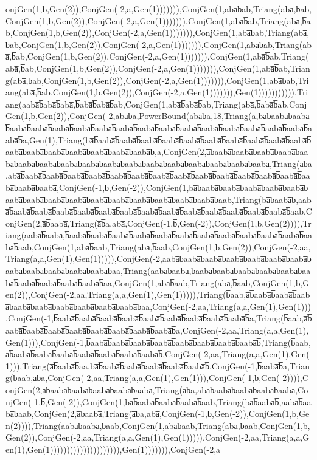 onjGen(1,b,Gen(2)),ConjGen(-2,a,Gen(1))))))),ConjGen(1,aba̅b̅ab,Triang(aba̅,b̅ab,ConjGen(1,b,Gen(2)),ConjGen(-2,a,Gen(1))))))),ConjGen(1,aba̅b̅ab,Triang(aba̅,b̅ab,ConjGen(1,b,Gen(2)),ConjGen(-2,a,Gen(1))))))),ConjGen(1,aba̅b̅ab,Triang(aba̅,b̅ab,ConjGen(1,b,Gen(2)),ConjGen(-2,a,Gen(1))))))),ConjGen(1,aba̅b̅ab,Triang(aba̅,b̅ab,ConjGen(1,b,Gen(2)),ConjGen(-2,a,Gen(1))))))),ConjGen(1,aba̅b̅ab,Triang(aba̅,b̅ab,ConjGen(1,b,Gen(2)),ConjGen(-2,a,Gen(1))))))),ConjGen(1,aba̅b̅ab,Triang(aba̅,b̅ab,ConjGen(1,b,Gen(2)),ConjGen(-2,a,Gen(1))))))),ConjGen(1,aba̅b̅ab,Triang(aba̅,b̅ab,ConjGen(1,b,Gen(2)),ConjGen(-2,a,Gen(1))))))),Gen(1))))))))))),Triang(aaba̅b̅aba̅b̅aba̅,b̅aba̅b̅aba̅b̅ab,ConjGen(1,aba̅b̅aba̅b̅ab,Triang(aba̅,b̅aba̅b̅ab,ConjGen(1,b,Gen(2)),ConjGen(-2,aba̅b̅a,PowerBound(aba̅b̅a,18,Triang(a,ba̅b̅aaba̅b̅aaba̅b̅aaba̅b̅aaba̅b̅aaba̅b̅aaba̅b̅aaba̅b̅aaba̅b̅aaba̅b̅aaba̅b̅aaba̅b̅aaba̅b̅aaba̅b̅aaba̅b̅aaba̅b̅aaba̅b̅aaba̅b̅a,Gen(1),Triang(ba̅b̅aaba̅b̅aaba̅b̅aaba̅b̅aaba̅b̅aaba̅b̅aaba̅b̅aaba̅b̅aaba̅b̅aaba̅b̅aaba̅b̅aaba̅b̅aaba̅b̅aaba̅b̅aaba̅b̅aaba̅b̅aaba̅b̅aaba̅b̅,a,ConjGen(2,a̅b̅aaba̅b̅aaba̅b̅aaba̅b̅aaba̅b̅aaba̅b̅aaba̅b̅aaba̅b̅aaba̅b̅aaba̅b̅aaba̅b̅aaba̅b̅aaba̅b̅aaba̅b̅aaba̅b̅aaba̅b̅aaba̅b̅aaba̅,Triang(a̅b̅a,aba̅b̅aaba̅b̅aaba̅b̅aaba̅b̅aaba̅b̅aaba̅b̅aaba̅b̅aaba̅b̅aaba̅b̅aaba̅b̅aaba̅b̅aaba̅b̅aaba̅b̅aaba̅b̅aaba̅b̅aaba̅b̅aaba̅,ConjGen(-1,b̅,Gen(-2)),ConjGen(1,ba̅b̅aaba̅b̅aaba̅b̅aaba̅b̅aaba̅b̅aaba̅b̅aaba̅b̅aaba̅b̅aaba̅b̅aaba̅b̅aaba̅b̅aaba̅b̅aaba̅b̅aaba̅b̅aaba̅b̅aaba̅b̅aab,Triang(ba̅b̅aaba̅b̅,aaba̅b̅aaba̅b̅aaba̅b̅aaba̅b̅aaba̅b̅aaba̅b̅aaba̅b̅aaba̅b̅aaba̅b̅aaba̅b̅aaba̅b̅aaba̅b̅aaba̅b̅aaba̅b̅aab,ConjGen(2,a̅b̅aaba̅,Triang(a̅b̅a,aba̅,ConjGen(-1,b̅,Gen(-2)),ConjGen(1,b,Gen(2)))),Triang(aaba̅b̅aaba̅,b̅aaba̅b̅aaba̅b̅aaba̅b̅aaba̅b̅aaba̅b̅aaba̅b̅aaba̅b̅aaba̅b̅aaba̅b̅aaba̅b̅aaba̅b̅aaba̅b̅aab,ConjGen(1,aba̅b̅aab,Triang(aba̅,b̅aab,ConjGen(1,b,Gen(2)),ConjGen(-2,aa,Triang(a,a,Gen(1),Gen(1))))),ConjGen(-2,aaba̅b̅aaba̅b̅aaba̅b̅aaba̅b̅aaba̅b̅aaba̅b̅aaba̅b̅aaba̅b̅aaba̅b̅aaba̅b̅aaba̅b̅aaba̅b̅aa,Triang(aaba̅b̅aaba̅,b̅aaba̅b̅aaba̅b̅aaba̅b̅aaba̅b̅aaba̅b̅aaba̅b̅aaba̅b̅aaba̅b̅aaba̅b̅aaba̅b̅aa,ConjGen(1,aba̅b̅aab,Triang(aba̅,b̅aab,ConjGen(1,b,Gen(2)),ConjGen(-2,aa,Triang(a,a,Gen(1),Gen(1))))),Triang(b̅aab,a̅b̅aaba̅b̅aaba̅b̅aaba̅b̅aaba̅b̅aaba̅b̅aaba̅b̅aaba̅b̅aaba̅b̅aaba̅b̅aa,ConjGen(-2,aa,Triang(a,a,Gen(1),Gen(1))),ConjGen(-1,b̅aaba̅b̅aaba̅b̅aaba̅b̅aaba̅b̅aaba̅b̅aaba̅b̅aaba̅b̅aaba̅b̅aaba̅b̅a,Triang(b̅aab,a̅b̅aaba̅b̅aaba̅b̅aaba̅b̅aaba̅b̅aaba̅b̅aaba̅b̅aaba̅b̅aaba̅b̅a,ConjGen(-2,aa,Triang(a,a,Gen(1),Gen(1))),ConjGen(-1,b̅aaba̅b̅aaba̅b̅aaba̅b̅aaba̅b̅aaba̅b̅aaba̅b̅aaba̅b̅aaba̅b̅,Triang(b̅aab,a̅b̅aaba̅b̅aaba̅b̅aaba̅b̅aaba̅b̅aaba̅b̅aaba̅b̅aaba̅b̅,ConjGen(-2,aa,Triang(a,a,Gen(1),Gen(1))),Triang(a̅b̅aaba̅b̅aa,ba̅b̅aaba̅b̅aaba̅b̅aaba̅b̅aaba̅b̅aaba̅b̅,ConjGen(-1,b̅aaba̅b̅a,Triang(b̅aab,a̅b̅a,ConjGen(-2,aa,Triang(a,a,Gen(1),Gen(1))),ConjGen(-1,b̅,Gen(-2)))),ConjGen(2,a̅b̅aaba̅b̅aaba̅b̅aaba̅b̅aaba̅b̅aaba̅,Triang(a̅b̅a,aba̅b̅aaba̅b̅aaba̅b̅aaba̅b̅aaba̅,ConjGen(-1,b̅,Gen(-2)),ConjGen(1,ba̅b̅aaba̅b̅aaba̅b̅aaba̅b̅aab,Triang(ba̅b̅aaba̅b̅,aaba̅b̅aaba̅b̅aab,ConjGen(2,a̅b̅aaba̅,Triang(a̅b̅a,aba̅,ConjGen(-1,b̅,Gen(-2)),ConjGen(1,b,Gen(2)))),Triang(aaba̅b̅aaba̅,b̅aab,ConjGen(1,aba̅b̅aab,Triang(aba̅,b̅aab,ConjGen(1,b,Gen(2)),ConjGen(-2,aa,Triang(a,a,Gen(1),Gen(1))))),ConjGen(-2,aa,Triang(a,a,Gen(1),Gen(1))))))))))))))))))))),Gen(1))))))),ConjGen(-2,a